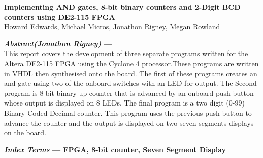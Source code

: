 \documentclass{article}
\begin{document}
\begin{center}

\vspace* {15 pt}
\Huge{\bf Implementing AND gates, 8-bit binary counters and 2-Digit BCD counters using DE2-115 FPGA  }\\
\vspace {20 pt}
\large{Howard Edwards, Michael Micros, Jonathon  Rigney, Megan Rowland \\}

\end{center}

\vspace{20 pt}




\begin{multicols*}{2}

{\bf  \textit {Abstract(Jonathon Rigney)} ---
}\\
This report covers the development of three separate programs written for the Altera DE2-115 FPGA using the Cyclone 4 processor.These programs are written in VHDL then synthesised onto the board. The first of these programs creates an and gate using two of the onboard switches with an LED for output. The Second program is 8 bit binary up counter that is advanced by an onboard push button whose output is displayed on 8 LEDs. The final program is a two digit (0-99) Binary Coded Decimal counter. This program uses the previous push button to advance the counter and the output is displayed on two seven segments displays on the board.


{\bf  \textit {Index Terms} --- FPGA, 8-bit counter, Seven Segment Display
}





\end{multicols*}
\end{document}
